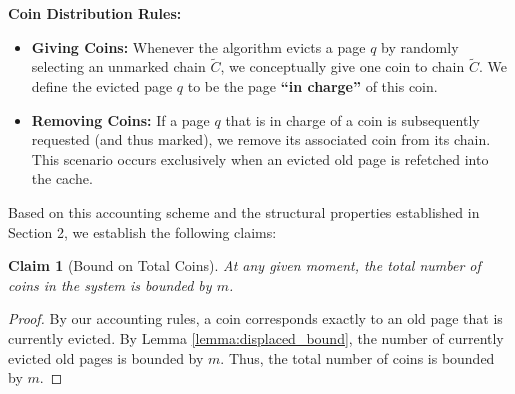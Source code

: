 \documentclass[a4paper]{article}
\newtheorem{claim}{Claim}      %
\begin{document}
\noindent\textbf{Coin Distribution Rules:}
\begin{itemize}
    \item \textbf{Giving Coins:} Whenever the algorithm evicts a page $q$ by randomly selecting an unmarked chain $\tilde{C}$, we conceptually give one coin to chain $\tilde{C}$. We define the evicted page $q$ to be the page \textbf{``in charge''} of this coin.
    \item \textbf{Removing Coins:} If a page $q$ that is in charge of a coin is subsequently requested (and thus marked), we remove its associated coin from its chain. This scenario occurs exclusively when an evicted old page is refetched into the cache.
\end{itemize}

Based on this accounting scheme and the structural properties established in Section 2, we establish the following claims:

\begin{claim}[Bound on Total Coins]
\label{claim:total_coins}
At any given moment, the total number of coins in the system is bounded by $m$.
\end{claim}
\begin{proof}
By our accounting rules, a coin corresponds exactly to an old page that is currently evicted. By Lemma \ref{lemma:displaced_bound}, the number of currently evicted old pages is bounded by $m$. Thus, the total number of coins is bounded by $m$.
\end{proof}
\end{document}
